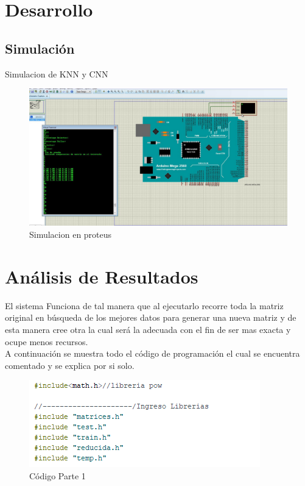 \documentclass[10pt,a4paper]{article}
\begin{document}
\section{Desarrollo}
\subsection{Simulación}
Simulacion de KNN y CNN 
\begin{figure}[H]
\caption{Simulacion en proteus}
\centering
\includegraphics[scale=0.5]{sim.png}
\end{figure} 


\section{Análisis de Resultados}
El sistema Funciona de tal manera que al ejecutarlo recorre toda la matriz original en búsqueda de los mejores datos para generar una nueva matriz y de esta manera cree otra la cual será la adecuada con el fin de ser mas exacta y ocupe menos recursos.\\

A continuación se muestra todo el código de programación el cual se encuentra comentado y se explica por si solo. 
\begin{figure}[H]
\caption{Código Parte 1}
\centering
\includegraphics[scale=0.9]{c1.png}
\end{figure}  
\end{document}
